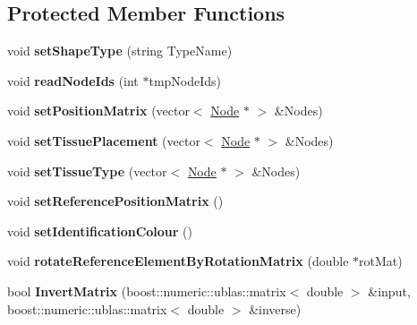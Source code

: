 \subsection*{Protected Member Functions}
\begin{DoxyCompactItemize}
\item 
\hypertarget{classShapeBase_a740a379f345d7d8046309313b6903950}{}void {\bfseries set\+Shape\+Type} (string Type\+Name)\label{classShapeBase_a740a379f345d7d8046309313b6903950}

\item 
\hypertarget{classShapeBase_a04859ea938c88369d48fa4e27bcd73f6}{}void {\bfseries read\+Node\+Ids} (int $\ast$tmp\+Node\+Ids)\label{classShapeBase_a04859ea938c88369d48fa4e27bcd73f6}

\item 
\hypertarget{classShapeBase_a93c774ad8de4f6ed3e70d98add1744b1}{}void {\bfseries set\+Position\+Matrix} (vector$<$ \hyperlink{classNode}{Node} $\ast$ $>$ \&Nodes)\label{classShapeBase_a93c774ad8de4f6ed3e70d98add1744b1}

\item 
\hypertarget{classShapeBase_abbffef73b01ff9d09f707c2aba28a1a1}{}void {\bfseries set\+Tissue\+Placement} (vector$<$ \hyperlink{classNode}{Node} $\ast$ $>$ \&Nodes)\label{classShapeBase_abbffef73b01ff9d09f707c2aba28a1a1}

\item 
\hypertarget{classShapeBase_a79d7d67d8b94081ea40c05c1c04a133a}{}void {\bfseries set\+Tissue\+Type} (vector$<$ \hyperlink{classNode}{Node} $\ast$ $>$ \&Nodes)\label{classShapeBase_a79d7d67d8b94081ea40c05c1c04a133a}

\item 
\hypertarget{classShapeBase_aa260269fe9605765f5adb494d1a99737}{}void {\bfseries set\+Reference\+Position\+Matrix} ()\label{classShapeBase_aa260269fe9605765f5adb494d1a99737}

\item 
\hypertarget{classShapeBase_a8dafd8524fe5aa5326173aa49a8f78a0}{}void {\bfseries set\+Identification\+Colour} ()\label{classShapeBase_a8dafd8524fe5aa5326173aa49a8f78a0}

\item 
\hypertarget{classShapeBase_afec65d5b9fd12a8dd8f1b28152f5ee93}{}void {\bfseries rotate\+Reference\+Element\+By\+Rotation\+Matrix} (double $\ast$rot\+Mat)\label{classShapeBase_afec65d5b9fd12a8dd8f1b28152f5ee93}

\item 
\hypertarget{classShapeBase_ab887eaa6a0be56e3b50f549326dbe87a}{}bool {\bfseries Invert\+Matrix} (boost\+::numeric\+::ublas\+::matrix$<$ double $>$ \&input, boost\+::numeric\+::ublas\+::matrix$<$ double $>$ \&inverse)\label{classShapeBase_ab887eaa6a0be56e3b50f549326dbe87a}


\end{DoxyCompactItemize}
